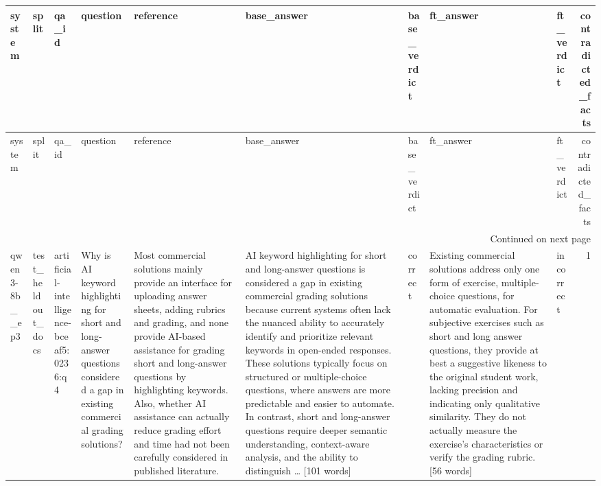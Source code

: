 \begin{longtable}{lllllllllr}
\toprule
system & split & qa\_id & question & reference & base\_answer & base\_verdict & ft\_answer & ft\_verdict & contradicted\_facts \\
\midrule
\endfirsthead
\toprule
system & split & qa\_id & question & reference & base\_answer & base\_verdict & ft\_answer & ft\_verdict & contradicted\_facts \\
\midrule
\endhead
\midrule
\multicolumn{10}{r}{Continued on next page} \\
\midrule
\endfoot
\bottomrule
\endlastfoot
qwen3-8b\_\_ep3 & test\_heldout\_docs & artificial-intelligence-bceaf5:0236:q4 & Why is AI keyword highlighting for short and long-answer questions considered a gap in existing commercial grading solutions? & Most commercial solutions mainly provide an interface for uploading answer sheets, adding rubrics and grading, and none provide AI-based assistance for grading short and long-answer questions by highlighting keywords. Also, whether AI assistance can actually reduce grading effort and time had not been carefully considered in published literature. & AI keyword highlighting for short and long-answer questions is considered a gap in existing commercial grading solutions because current systems often lack the nuanced ability to accurately identify and prioritize relevant keywords in open-ended responses. These solutions typically focus on structured or multiple-choice questions, where answers are more predictable and easier to automate. In contrast, short and long-answer questions require deeper semantic understanding, context-aware analysis, and the ability to distinguish … [101 words] & correct & Existing commercial solutions address only one form of exercise, multiple-choice questions, for automatic evaluation. For subjective exercises such as short and long answer questions, they provide at best a suggestive likeness to the original student work, lacking precision and indicating only qualitative similarity. They do not actually measure the exercise's characteristics or verify the grading rubric. [56 words] & incorrect & 1 \\
\end{longtable}

